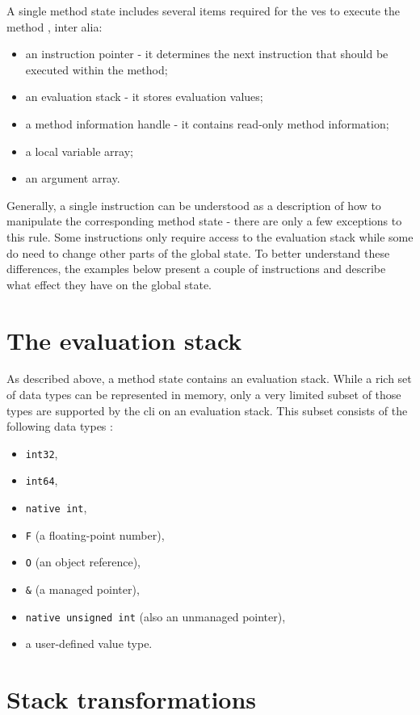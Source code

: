 \documentclass[declaration,shortabstract,english,mgr]{iithesis}
\begin{document}
A single method state includes several items required for the \acrshort{ves} to execute the method \cite{ecmaStandard}, inter alia:
\begin{itemize}
	\item{an instruction pointer - it determines the next instruction that should be executed within the method;}
	\item{an evaluation stack - it stores evaluation values;}
	\item{a method information handle - it contains read-only method information;}
	\item{a local variable array;}
	\item{an argument array.}
\end{itemize}

Generally, a single instruction can be understood as a description of how to manipulate the corresponding method state - there are only a few exceptions to this rule. Some instructions only require access to the evaluation stack while some do need to change other parts of the global state. To better understand these differences, the examples below present a couple of instructions and describe what effect they have on the global state.

\section{The evaluation stack}

As described above, a method state contains an evaluation stack. While a rich set of data types can be represented in memory, only a very limited subset of those types are supported by the \acrshort{cli} on an evaluation stack. This subset consists of the following data types \cite{ecmaStandard}:
\begin{itemize}
	\item{\texttt{int32},}
	\item{\texttt{int64},}
	\item{\texttt{native int},}
	\item{\texttt{F} (a floating-point number),}
	\item{\texttt{O} (an object reference),}
	\item{\texttt{\&} (a managed pointer),}
	\item{\texttt{native unsigned int} (also an unmanaged pointer),}
	\item{a user-defined value type.}
\end{itemize}

\section{Stack transformations}
\label{sec:stackTransformations}
\end{document}
